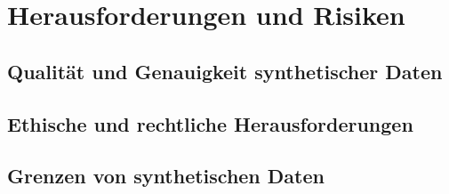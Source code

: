 \documentclass[../main.tex]{subfiles}
\begin{document}
\chapter{Herausforderungen und Risiken}
\section{Qualität und Genauigkeit synthetischer Daten}
\section{Ethische und rechtliche Herausforderungen}
\section{Grenzen von synthetischen Daten}
\end{document}

